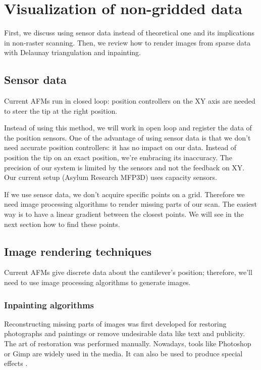 \chapter{Visualization of non-gridded data}

First, we discuss using sensor data instead of theoretical one and its implications in non-raster scanning. Then, we review how to render images from sparse data with Delaunay triangulation and inpainting. 

\section{Sensor data}
 
Current AFMs run in closed loop: position controllers on the XY axis are needed to steer the tip at the right position. 

Instead of using this method, we will work in open loop and register the data of the position sensors. One of the advantage of using sensor data is that we don't need accurate position controllers: it has no impact on our data. Instead of position the tip on an exact position, we're embracing its inaccuracy. The precision of our system is limited by the sensors and not the feedback on XY. Our current setup (Asylum Research MFP3D) uses capacity sensors.

If we use sensor data, we don't acquire specific points on a grid. Therefore we need image processing algorithms to render missing parts of our scan.  The easiest way is to have a linear gradient between the closest points. We will see in the next section how to find these points. 

\section{Image rendering techniques}

Current AFMs give discrete data about the cantilever's position; therefore, we'll need to use image processing algorithms to generate images. 

\subsection{Inpainting algorithms}

Reconstructing missing parts of images was first developed for restoring photographs and paintings or remove undesirable data like text and publicity. The art of restoration was performed manually. Nowadays, tools like Photoshop or Gimp are widely used in the media. It can also be used to produce special effects \cite{richard2001fast}.

